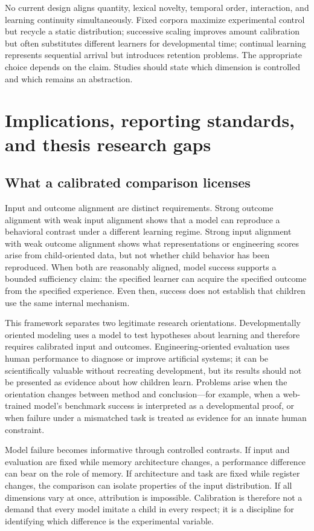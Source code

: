 No current design aligns quantity, lexical novelty, temporal order, interaction, and learning continuity simultaneously. Fixed corpora maximize experimental control but recycle a static distribution; successive scaling improves amount calibration but often substitutes different learners for developmental time; continual learning represents sequential arrival but introduces retention problems. The appropriate choice depends on the claim. Studies should state which dimension is controlled and which remains an abstraction.


\section{Implications, reporting standards, and thesis research gaps}
\label{sec:litreview:implications}

\subsection{What a calibrated comparison licenses}
\label{sec:litreview:inference}

Input and outcome alignment are distinct requirements. Strong outcome alignment with weak input alignment shows that a model can reproduce a behavioral contrast under a different learning regime. Strong input alignment with weak outcome alignment shows what representations or engineering scores arise from child-oriented data, but not whether child behavior has been reproduced. When both are reasonably aligned, model success supports a bounded sufficiency claim: the specified learner can acquire the specified outcome from the specified experience. Even then, success does not establish that children use the same internal mechanism.

This framework separates two legitimate research orientations. Developmentally oriented modeling uses a model to test hypotheses about learning and therefore requires calibrated input and outcomes. Engineering-oriented evaluation uses human performance to diagnose or improve artificial systems; it can be scientifically valuable without recreating development, but its results should not be presented as evidence about how children learn. Problems arise when the orientation changes between method and conclusion---for example, when a web-trained model's benchmark success is interpreted as a developmental proof, or when failure under a mismatched task is treated as evidence for an innate human constraint.

Model failure becomes informative through controlled contrasts. If input and evaluation are fixed while memory architecture changes, a performance difference can bear on the role of memory. If architecture and task are fixed while register changes, the comparison can isolate properties of the input distribution. If all dimensions vary at once, attribution is impossible. Calibration is therefore not a demand that every model imitate a child in every respect; it is a discipline for identifying which difference is the experimental variable.

